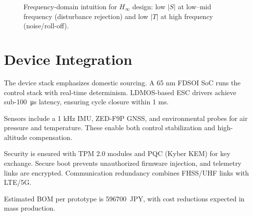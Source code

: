 \documentclass[conference]{IEEEtran}
\begin{document}
\begin{figure}[t]
\centering
{}
\caption{Frequency-domain intuition for $H_\infty$ design: low $|S|$ at low--mid frequency (disturbance rejection) and low $|T|$ at high frequency (noise/roll-off).}
\label{fig:weights}
\end{figure}

\section{Device Integration}
The device stack emphasizes domestic sourcing. A 65 nm FDSOI SoC runs the control stack with real-time determinism. LDMOS-based ESC drivers achieve sub-\SI{100}{\micro\second} latency, ensuring cycle closure within 1 ms.  

Sensors include a 1 kHz IMU, ZED-F9P GNSS, and environmental probes for air pressure and temperature. These enable both control stabilization and high-altitude compensation.  

Security is ensured with TPM 2.0 modules and PQC (Kyber KEM) for key exchange. Secure boot prevents unauthorized firmware injection, and telemetry links are encrypted. Communication redundancy combines FHSS/UHF links with LTE/5G.  

Estimated BOM per prototype is \SI{596700}{JPY}, with cost reductions expected in mass production.  
\end{document}
